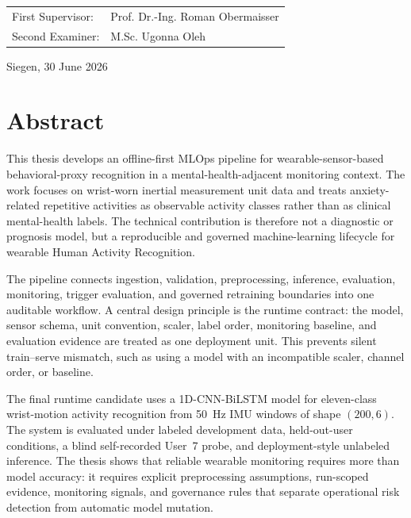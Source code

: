 \documentclass[12pt,a4paper,oneside]{report}
\begin{document}
\begin{titlepage}
\vspace{1.3cm}

\begin{tabular}{ll}
  First Supervisor: & Prof. Dr.-Ing. Roman Obermaisser \\
  Second Examiner:  & M.Sc. Ugonna Oleh \\
\end{tabular}

\vfill

{\normalsize Siegen, 30 June 2026\par}

\end{titlepage}

\chapter*{Abstract}

This thesis develops an offline-first MLOps pipeline for wearable-sensor-based behavioral-proxy recognition in a mental-health-adjacent monitoring context. The work focuses on wrist-worn inertial measurement unit data and treats anxiety-related repetitive activities as observable activity classes rather than as clinical mental-health labels. The technical contribution is therefore not a diagnostic or prognosis model, but a reproducible and governed machine-learning lifecycle for wearable Human Activity Recognition.

The pipeline connects ingestion, validation, preprocessing, inference, evaluation, monitoring, trigger evaluation, and governed retraining boundaries into one auditable workflow. A central design principle is the runtime contract: the model, sensor schema, unit convention, scaler, label order, monitoring baseline, and evaluation evidence are treated as one deployment unit. This prevents silent train--serve mismatch, such as using a model with an incompatible scaler, channel order, or baseline.

The final runtime candidate uses a 1D-CNN-BiLSTM model for eleven-class wrist-motion activity recognition from 50~Hz IMU windows of shape \((200,6)\). The system is evaluated under labeled development data, held-out-user conditions, a blind self-recorded User~7 probe, and deployment-style unlabeled inference. The thesis shows that reliable wearable monitoring requires more than model accuracy: it requires explicit preprocessing assumptions, run-scoped evidence, monitoring signals, and governance rules that separate operational risk detection from automatic model mutation.
\end{document}
